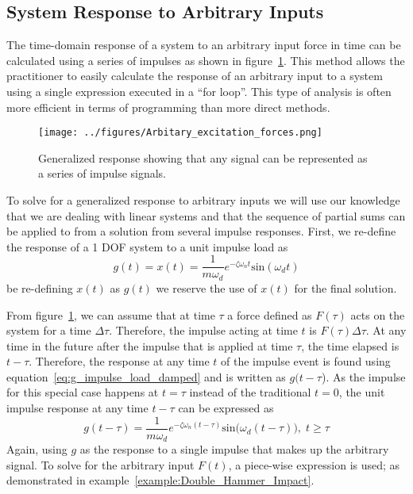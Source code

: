 \documentclass[12pt,letter]{article}
\begin{document}
\subsection{System Response to Arbitrary Inputs}

\label{sec:impulse_inputs}

The time-domain response of a system to an arbitrary input force in time can be calculated using a series of impulses as shown in figure~\ref{fig:Arbitary_excitation_forces}. This method allows the practitioner to easily calculate the response of an arbitrary input to a system using a single expression executed in a ``for loop''. This type of analysis is often more efficient in terms of programming than more direct methods. 

\begin{figure}[H]
	\centering
	\texttt{[image: ../figures/Arbitary\_excitation\_forces.png]}
	\caption{Generalized response showing that any signal can be represented as a series of impulse signals. }
	\label{fig:Arbitary_excitation_forces}
\end{figure}

To solve for a generalized response to arbitrary inputs we will use our knowledge that we are dealing with linear systems and that the sequence of partial sums can be applied to from a solution from several impulse responses. First, we re-define the response of a 1 DOF system to a unit impulse load as 
\begin{equation}
g(t) = x(t) =\frac{1}{m \omega_d} e^{-\zeta \omega_n t} \text{sin}(\omega_dt)
\label{eq:g_impulse_load_damped}
\end{equation}
be re-defining $x(t)$ as $g(t)$ we reserve the use of $x(t)$ for the final solution.

From figure~\ref{fig:Arbitary_excitation_forces}, we can assume that at time $\tau$ a force defined as $F(\tau)$ acts on the system for a time $\Delta \tau$. Therefore, the impulse acting at time $t$ is $F(\tau) \Delta \tau$.
At any time in the future after the impulse that is applied at time $\tau$, the time elapsed is $t - \tau$. Therefore, the response at any time $t$ of the impulse event is found using equation~\ref{eq:g_impulse_load_damped} and is written as $g(t-\tau$). As the impulse for this special case happens at $t=\tau$ instead of the traditional $t=0$, the unit impulse response at any time $t-\tau$ can be expressed as
\begin{equation}
g(t-\tau) = \frac{1}{m \omega_d} e^{-\zeta \omega_n (t-\tau)} \text{sin}\big(\omega_d (t-\tau)\big), \;  t \ge \tau
\label{eq:g_of_t_minus_tau}
\end{equation}
Again, using $g$ as the response to a single impulse that makes up the arbitrary signal. To solve for the arbitrary input $F(t)$, a piece-wise expression is used; as demonstrated in example~\ref{example:Double_Hammer_Impact}.
\end{document}
